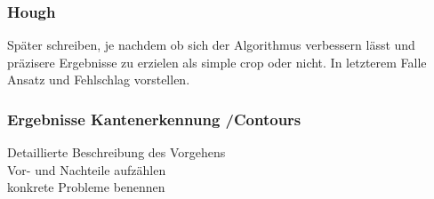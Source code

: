 \subsubsection{Hough}

Später schreiben, je nachdem ob sich der Algorithmus verbessern lässt und präzisere Ergebnisse zu erzielen als simple crop oder nicht. In letzterem Falle Ansatz und Fehlschlag vorstellen.\\

\subsubsection{Ergebnisse Kantenerkennung /Contours}
Detaillierte Beschreibung des Vorgehens\\
Vor- und Nachteile aufzählen\\
konkrete Probleme benennen\\
